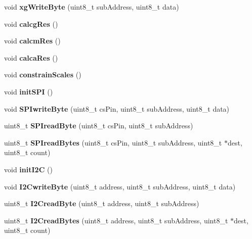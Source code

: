 \begin{DoxyCompactItemize}
void {\bfseries xg\+Write\+Byte} (uint8\+\_\+t sub\+Address, uint8\+\_\+t data)
\item 
\mbox{\label{classLSM9DS1_a303e0dd33e000579dc3917aecedb6e63}} 
void {\bfseries calcg\+Res} ()
\item 
\mbox{\label{classLSM9DS1_a830dfc95c7e2d8524720d78357b053cb}} 
void {\bfseries calcm\+Res} ()
\item 
\mbox{\label{classLSM9DS1_a31597c9ae6c5a7de64a50cbbbcd24297}} 
void {\bfseries calca\+Res} ()
\item 
\mbox{\label{classLSM9DS1_a5aadcd09cf9157de817c359e49304ca7}} 
void {\bfseries constrain\+Scales} ()
\item 
\mbox{\label{classLSM9DS1_a4286d5803ab028c657e007ae99acc60a}} 
void {\bfseries init\+S\+PI} ()
\item 
\mbox{\label{classLSM9DS1_a83321c9d6ec50f6b9944907d2be482cd}} 
void {\bfseries S\+P\+Iwrite\+Byte} (uint8\+\_\+t cs\+Pin, uint8\+\_\+t sub\+Address, uint8\+\_\+t data)
\item 
\mbox{\label{classLSM9DS1_a6f0f50bb5e9b702d5a19c7441a3f9d8b}} 
uint8\+\_\+t {\bfseries S\+P\+Iread\+Byte} (uint8\+\_\+t cs\+Pin, uint8\+\_\+t sub\+Address)
\item 
\mbox{\label{classLSM9DS1_a9c3da52e116cdd0c8ac121e5b7b517fa}} 
uint8\+\_\+t {\bfseries S\+P\+Iread\+Bytes} (uint8\+\_\+t cs\+Pin, uint8\+\_\+t sub\+Address, uint8\+\_\+t $\ast$dest, uint8\+\_\+t count)
\item 
\mbox{\label{classLSM9DS1_ae60332c2836bd3f19846b7a44c015ddd}} 
void {\bfseries init\+I2C} ()
\item 
\mbox{\label{classLSM9DS1_a8e66108a002cc15ec4c0db0a608d20c6}} 
void {\bfseries I2\+Cwrite\+Byte} (uint8\+\_\+t address, uint8\+\_\+t sub\+Address, uint8\+\_\+t data)
\item 
\mbox{\label{classLSM9DS1_a7fc046d4b335494331905fdeb5c81c9e}} 
uint8\+\_\+t {\bfseries I2\+Cread\+Byte} (uint8\+\_\+t address, uint8\+\_\+t sub\+Address)
\item 
\mbox{\label{classLSM9DS1_adfc9a22290daddd7787e8023fa8f12cc}} 
uint8\+\_\+t {\bfseries I2\+Cread\+Bytes} (uint8\+\_\+t address, uint8\+\_\+t sub\+Address, uint8\+\_\+t $\ast$dest, uint8\+\_\+t count)
\end{DoxyCompactItemize}
